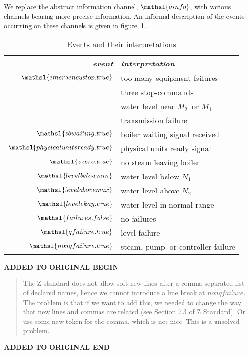 \documentclass{report}
\newcommand{\event}[1]{\mathsl{#1}}
\newenvironment{addedstuff}{\begin{flushleft}\textbf{ADDED TO ORIGINAL BEGIN}\begin{quote}\begin{minipage}{.8\textwidth}}{\end{minipage}\end{quote}\textbf{ADDED TO ORIGINAL END}\end{flushleft}}
\begin{document}
We replace the abstract information channel, \( \mathsl{ainfo} \),
with various channels bearing more precise information.  An informal
description of the events occurring on these channels is given in
figure~\ref{figure:events}.
\begin{table}[htbp]
  \bigskip %
  \begin{center}
    \begin{tabular}{r|l}
      \textbf{\slshape event} & \textbf{\slshape interpretation}
      \\ %
      \hline %
      \( \event{emergencystop.true} \) & too many equipment failures
      \\ %
      & three stop-commands
      \\ %
      & water level near \( M_2 \, \)\/ or \( M_1 \)
      \\ %
      & transmission failure
      \\ %
      \( \event{sbwaiting.true} \) & boiler waiting signal received
      \\ %
      \( \event{physicalunitsready.true} \) & physical units ready signal
      \\ %
      \( \event{vzero.true} \) & no steam leaving boiler
      \\ %
      \( \event{levelbelowmin} \) & water level below \( N_1 \)
      \\ %
      \( \event{levelabovemax} \) & water level above \( N_2 \)
      \\ %
      \( \event{levelokay.true} \) & water level in normal range
      \\ %
      \( \event{failures.false} \) & no failures
      \\ %
      \( \event{qfailure.true} \) & level failure
      \\ %
      \( \event{nonqfailure.true} \) & steam, pump, or controller failure
    \end{tabular}
  \end{center}
  \caption{Events and their interpretations}\label{figure:events}
\end{table}
%
\begin{addedstuff}
   The Z standard does not allow soft new lines after a comma-separated list
   of declared names, hence we cannot introduce a line break at $nonqfailure$.
   The problem is that if we want to add this, we needed to change the way that
   new lines and commas are related (see Section 7.3 of Z Standard). Or use some
   new token for the comma, which is not nice. This is a unsolved problem.
\end{addedstuff}
\end{document}
